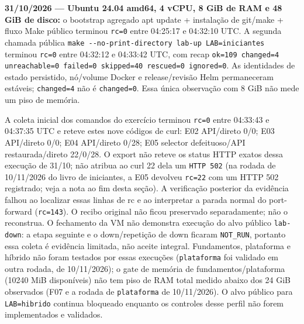 \documentclass[12pt,openany,oneside,a4paper,chapter=TITLE,english,brazil]{abntex2}
\begin{document}
\begin{apendicesenv}
\textbf{31/10/2026 --- Ubuntu 24.04 amd64, 4 vCPU, 8 GiB de RAM e 48 GiB de disco:}
o bootstrap agregado apt update + instalação de git/make + fluxo Make público
terminou \texttt{rc=\allowbreak{}0} entre 04:25:17 e 04:32:10 UTC. A segunda chamada pública
\texttt{make -{}\allowbreak{}-{}\allowbreak{}no-{}\allowbreak{}print-{}\allowbreak{}directory lab-{}\allowbreak{}up LAB=\allowbreak{}iniciantes} terminou \texttt{rc=\allowbreak{}0} entre
04:32:12 e 04:33:42 UTC, com recap
\texttt{ok=\allowbreak{}109 changed=\allowbreak{}4 unreachable=\allowbreak{}0 failed=\allowbreak{}0 skipped=\allowbreak{}40 rescued=\allowbreak{}0 ignored=\allowbreak{}0}.
As identidades de estado persistido, nó/volume Docker e release/revisão Helm permaneceram
estáveis; \texttt{changed=\allowbreak{}4} não é \texttt{changed=\allowbreak{}0}. Essa única observação com 8 GiB não mede
um piso de memória.

A coleta inicial dos comandos do exercício terminou \texttt{rc=\allowbreak{}0} entre 04:33:43 e 04:37:35 UTC e reteve
estes nove códigos de curl: E02 API/direto 0/0; E03 API/direto 0/0; E04
API/direto 0/28; E05 selector defeituoso/API restaurada/direto 22/0/28.
O export não reteve os status HTTP exatos dessa execução de 31/10; não atribua ao
curl 22 dela um \texttt{HTTP 502} (na rodada de 10/11/2026 do livro de iniciantes, a E05 devolveu
\texttt{rc=\allowbreak{}22} com um HTTP 502 registrado; veja a nota ao fim desta seção). A verificação posterior da evidência falhou ao
localizar essas linhas de rc e ao interpretar a parada normal do port-forward
(\texttt{rc=\allowbreak{}143}). O recibo original não ficou preservado separadamente; não o
reconstrua. O fechamento da VM não demonstra execução do alvo público
\texttt{lab-{}\allowbreak{}down}: a etapa seguinte e o down/repetição de down ficaram \texttt{NOT\_\allowbreak{}RUN}, portanto essa
coleta é evidência limitada, não aceite integral. Fundamentos, plataforma e
híbrido não foram testados por essas execuções (\texttt{plataforma} foi validado em outra rodada, de 10/11/2026); o gate de memória de
fundamentos/plataforma (10240 MiB disponíveis) não tem piso de RAM total medido
abaixo dos 24 GiB observados (F07 e a rodada de \texttt{plataforma} de 10/11/2026). O alvo público para \texttt{LAB=\allowbreak{}hibrido}
continua bloqueado enquanto os controles desse perfil não forem implementados
e validados.


\end{apendicesenv}
\end{document}
